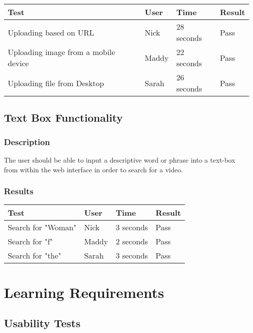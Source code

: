 \documentclass{scrreprt}
\begin{document}
 \centering
 \begin{tabular}{||p{4.5cm}|p{2.5cm}|p{2.5cm}|p{2.5cm}||}
 \hline
 \bf Test & \bf User & \bf Time & \bf Result \\
 \hline\hline
    Uploading based on URL & Nick & 28 seconds & Pass\\
 \hline\hline
    Uploading image from a mobile device & Maddy & 22 seconds  & Pass\\
 \hline\hline
    Uploading file from Desktop &  Sarah & 26 seconds & Pass\\
 \hline
 \end{tabular}
 
\subsection{Text Box Functionality}
\subsubsection{Description}
\begin{flushleft}
The user should be able to input a descriptive word or phrase into a text-box from within the web interface in order to search for a video.
\subsubsection{Results}
\end{flushleft}

 \centering
 \begin{tabular}{||p{4.5cm}|p{2.5cm}|p{2.5cm}|p{2.5cm}||}
 \hline
 \bf Test & \bf User & \bf Time & \bf Result \\
 \hline\hline
   Search for "Woman" & Nick & 3 seconds  & Pass\\ %
 \hline\hline
   Search for "f" & Maddy & 2 seconds  & Pass\\
 \hline\hline
   Search for "the" & Sarah & 3 seconds  & Pass\\
 \hline
 \end{tabular}

\section{Learning Requirements}

\subsection{Usability Tests}
\end{document}
